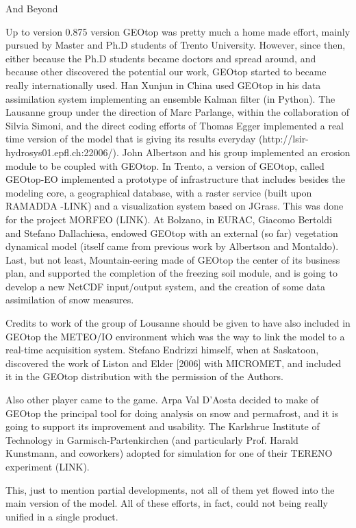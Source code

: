 And Beyond

Up to version 0.875 version GEOtop was pretty much a home made effort, mainly pursued by Master and Ph.D students of Trento University. However, since then, either because the Ph.D students became doctors and spread around, and because other discovered the potential our work, GEOtop started to became really internationally used. Han Xunjun in China used GEOtop in his data assimilation system implementing an ensemble Kalman filter (in Python). The Lausanne group under the direction of Marc Parlange, within the collaboration of Silvia Simoni, and the direct coding efforts of Thomas Egger implemented a real time version of the model that is giving its results everyday (http://lsir-hydrosys01.epfl.ch:22006/). John Albertson and his group implemented an erosion module to be coupled with GEOtop. In Trento, a version of GEOtop, called GEOtop-EO implemented a prototype of  infrastructure that includes besides the modeling core, a geographical database, with a raster service (built upon RAMADDA -LINK) and a visualization system based on JGrass. This was done for the project MORFEO (LINK).  At Bolzano, in EURAC, Giacomo Bertoldi and Stefano Dallachiesa, endowed GEOtop with an external (so far) vegetation dynamical model (itself came from previous work by Albertson and Montaldo). Last, but not least, Mountain-eering made of GEOtop the center of its business plan, and supported the completion of the freezing soil module, and is going to develop a new NetCDF input/output system, and the creation of some data assimilation of snow measures. 

Credits to work of the group of Lousanne should be given to have also included in GEOtop the METEO/IO environment which was the way to link the model to a real-time acquisition system.  Stefano Endrizzi himself, when at Saskatoon, discovered the work of Liston and Elder [2006] with MICROMET, and included it in the GEOtop distribution with the permission of the Authors. 

Also other player came  to the game. Arpa Val D'Aosta decided to make of GEOtop the principal tool for doing analysis on snow and permafrost, and it is going to support its improvement and usability. The Karlshrue Institute of Technology in Garmisch-Partenkirchen (and particularly Prof. Harald Kunstmann, and coworkers) adopted for simulation for one of their TERENO experiment (LINK).  

This, just to mention partial developments, not all of them yet flowed into the main version of the model. All of these efforts, in fact, could not being really unified in a single product. 


